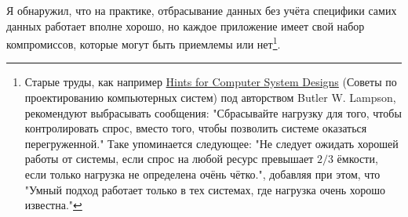 Я обнаружил, что на практике, отбрасывание данных без учёта специфики самих данных работает вполне хорошо, но каждое приложение имеет свой набор компромиссов, которые могут быть приемлемы или нет\footnote{Старые труды, как например \href{http://research.microsoft.com/en-us/um/people/blampson/33-hints/webpage.html}{Hints for Computer System Designs} (Советы по проектированию компьютерных систем) под авторством Butler W. Lampson, рекомендуют выбрасывать сообщения: "Сбрасывайте нагрузку для того, чтобы контролировать спрос, вместо того, чтобы позволить системе оказаться перегруженной." Таке упоминается следующее: "Не следует ожидать хорошей работы от системы, если спрос на любой ресурс превышает $2/3$ ёмкости, если только нагрузка не определена очёнь чётко.", добавляя при этом, что "Умный подход работает только в тех системах, где нагрузка очень хорошо известна."}.

